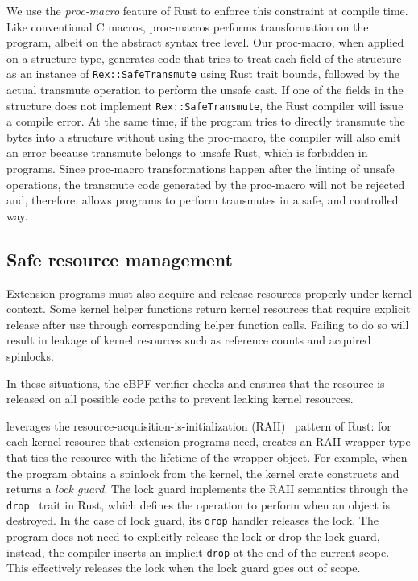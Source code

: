 We use the \emph{proc-macro} feature of Rust to enforce this constraint at
    compile time.
Like conventional C macros, proc-macros performs transformation on the program,
    albeit on the abstract syntax tree level.
Our proc-macro, when applied on a structure type, generates code that tries
    to treat each field of the structure as an instance of
    \texttt{Rex::SafeTransmute} using Rust trait bounds, followed by the actual
    transmute operation to perform the unsafe cast.
If one of the fields in the structure does not implement
    \texttt{Rex::SafeTransmute}, the Rust compiler will issue a compile error.
At the same time, if the program tries to directly transmute the bytes into a
    structure without using the proc-macro, the compiler will also emit an
    error because transmute belongs to unsafe Rust, which is forbidden in
    \projname{} programs.
Since proc-macro transformations happen after the linting of unsafe operations,
    the transmute code generated by the proc-macro will not be rejected and,
    therefore, allows programs to perform transmutes in a safe, and controlled
    way.

\subsection{Safe resource management}
Extension programs must also acquire and release
    resources properly under kernel context.
Some kernel helper functions return kernel resources that require
    explicit release after use through corresponding helper function calls.
Failing to do so will result in leakage of kernel resources such as reference
    counts and acquired spinlocks.

In these situations, the eBPF verifier checks and ensures that the resource is
    released on all possible code paths to prevent leaking kernel resources.

\projname{} leverages the resource-acquisition-is-initialization
    (RAII)~\cite{rust-raii} pattern of Rust: for each kernel resource that
    extension programs need, \projname{} creates an RAII wrapper type that ties
    the resource with the lifetime of the wrapper object.
For example, when the program obtains a spinlock from the kernel, the
    \projname{} kernel crate constructs and returns a \emph{lock guard}.
The lock guard implements the RAII semantics through the
    \texttt{drop}~\cite{rust-drop} trait in
    Rust, which defines the operation to perform when an object is destroyed.
In the case of lock guard, its \texttt{drop} handler releases the lock.
The program does not need to explicitly release the lock or drop the lock
    guard, instead, the compiler inserts an implicit \texttt{drop} at the end
    of the current scope. This effectively releases the lock when the lock
    guard goes out of scope.

